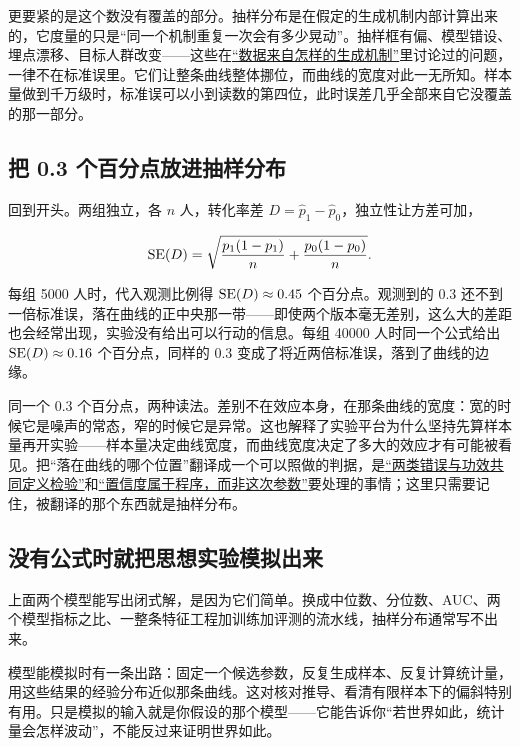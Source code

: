 更要紧的是这个数没有覆盖的部分。抽样分布是在假定的生成机制内部计算出来的，它度量的只是``同一个机制重复一次会有多少晃动''。抽样框有偏、模型错设、埋点漂移、目标人群改变——这些在\hyperref[sec:11-Mathematical-Statistics/01-Statistical-Models/01]{``数据来自怎样的生成机制''}里讨论过的问题，一律不在标准误里。它们让整条曲线整体挪位，而曲线的宽度对此一无所知。样本量做到千万级时，标准误可以小到读数的第四位，此时误差几乎全部来自它没覆盖的那一部分。

\subsection{把 0.3 个百分点放进抽样分布}

回到开头。两组独立，各 \(n\) 人，转化率差 \(D=\hat p_1-\hat p_0\)，独立性让方差可加，

\[
\operatorname{SE}(D)=\sqrt{\frac{p_1(1-p_1)}{n}+\frac{p_0(1-p_0)}{n}}.
\]

每组 5000 人时，代入观测比例得 \(\operatorname{SE}(D)\approx0.45\) 个百分点。观测到的 \(0.3\) 还不到一倍标准误，落在曲线的正中央那一带——即使两个版本毫无差别，这么大的差距也会经常出现，实验没有给出可以行动的信息。每组 40000 人时同一个公式给出 \(\operatorname{SE}(D)\approx0.16\) 个百分点，同样的 \(0.3\) 变成了将近两倍标准误，落到了曲线的边缘。

同一个 \(0.3\) 个百分点，两种读法。差别不在效应本身，在那条曲线的宽度：宽的时候它是噪声的常态，窄的时候它是异常。这也解释了实验平台为什么坚持先算样本量再开实验——样本量决定曲线宽度，而曲线宽度决定了多大的效应才有可能被看见。把``落在曲线的哪个位置''翻译成一个可以照做的判据，是\hyperref[sec:11-Mathematical-Statistics/05-Hypothesis-Testing/01]{``两类错误与功效共同定义检验''}和\hyperref[sec:11-Mathematical-Statistics/04-Interval-Estimation/01]{``置信度属于程序，而非这次参数''}要处理的事情；这里只需要记住，被翻译的那个东西就是抽样分布。

\subsection{没有公式时就把思想实验模拟出来}

上面两个模型能写出闭式解，是因为它们简单。换成中位数、分位数、AUC、两个模型指标之比、一整条特征工程加训练加评测的流水线，抽样分布通常写不出来。

模型能模拟时有一条出路：固定一个候选参数，反复生成样本、反复计算统计量，用这些结果的经验分布近似那条曲线。这对核对推导、看清有限样本下的偏斜特别有用。只是模拟的输入就是你假设的那个模型——它能告诉你``若世界如此，统计量会怎样波动''，不能反过来证明世界如此。


